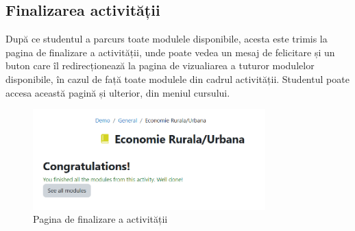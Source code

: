 \subsection{Finalizarea activității}
După ce studentul a parcurs toate modulele disponibile, acesta este trimis la pagina de finalizare a activității, unde poate vedea un mesaj de felicitare și un buton care îl redirecționează 
la pagina de vizualiarea a tuturor modulelor disponibile, în cazul de față toate modulele din cadrul activității. Studentul poate accesa această pagină și ulterior, din meniul cursului.
\begin{figure}[H]
    \centering
    \includegraphics[width=0.8\textwidth]{images/finishPage.png}
    \caption{Pagina de finalizare a activității}
    \label{fig:pagina_finalizare_activitate}
\end{figure}